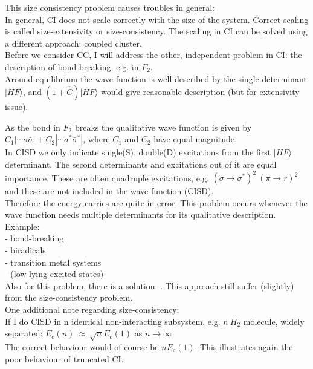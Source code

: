 \documentclass[a4paper, 12pt]{article}
\begin{document}
This size consistency problem causes troubles in general: \\
\tab In general, CI does not scale correctly with the size of the system. Correct scaling is called size-extensivity or size-consistency. The scaling in CI can be solved using a different approach: coupled cluster. \\
\tab Before we consider CC, I will address the other, independent problem in CI: the description of bond-breaking, e.g. in $F_2$.\\
\tab Around equilibrium the wave function is well described  by the single determinant $|HF\rangle$, and $(1+\hat{C})|HF\rangle$ would give reasonable description (but for extensivity issue).

As the bond in $F_2$ breaks the qualitative wave function is given by $C_1|\cdots \sigma\bar{\sigma } |+C_2|\cdots \sigma^*\bar{\sigma}^* |$, where $C_1$ and $C_2$ have equal magnitude. \\
\tab In CISD we only indicate single(S), double(D) excitations from the first $|HF\rangle$ determinant. The second determinants and excitations out of it are equal importance. These are often quadruple excitations, e.g. $(\sigma \rightarrow \sigma^* )^2 \ (\pi \rightarrow r )^2$ and these are not included in the wave function (CISD). \\
\tab Therefore the energy carries are quite in error. This problem occurs whenever the wave function needs multiple determinants for its qualitative description. \\
\tab Example: \\
\tab\tab \tab - bond-breaking\\
\tab\tab \tab - biradicals \\
\tab\tab \tab - transition metal systems \\
\tab\tab \tab - (low lying excited states)\\
\tab Also for this problem, there is a solution: . This approach still suffer (slightly) from the size-consistency problem. \\




One additional note regarding size-consistency: \\
\tab If I do CISD in n identical non-interacting subsystem. e.g. $n \ H_2$ molecule, widely separated: $E_c(n) \ \approx \ \sqrt{n} E_c(1)$ as $n\rightarrow \infty$\\
\tab The correct behaviour would of course be $nE_c(1)$. This illustrates again the poor behaviour of truncated CI.
\end{document}
